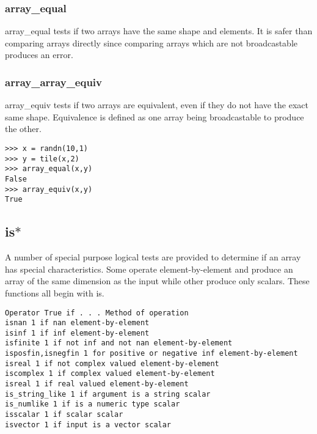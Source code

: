 \documentclass[KSmain.tex]{subfiles}
\begin{document}
\subsubsection{array\_equal}
array\_equal tests if two arrays have the same shape and elements. It is safer than comparing arrays directly
since comparing arrays which are not broadcastable produces an error.
\subsubsection{array\_array\_equiv}
array\_equiv tests if two arrays are equivalent, even if they do not have the exact same shape. Equivalence
is defined as one array being broadcastable to produce the other.
\begin{framed}
\begin{verbatim}>>> x = randn(10,1)
>>> y = tile(x,2)
>>> array_equal(x,y)
False
>>> array_equiv(x,y)
True
\end{verbatim}
\end{framed}

\subsection{ is$\ast$}
A number of special purpose logical tests are provided to determine if an array has special characteristics.
Some operate element-by-element and produce an array of the same dimension as the input while other
produce only scalars. These functions all begin with is.

\begin{verbatim}
Operator True if . . . Method of operation
isnan 1 if nan element-by-element
isinf 1 if inf element-by-element
isfinite 1 if not inf and not nan element-by-element
isposfin,isnegfin 1 for positive or negative inf element-by-element
isreal 1 if not complex valued element-by-element
iscomplex 1 if complex valued element-by-element
isreal 1 if real valued element-by-element
is_string_like 1 if argument is a string scalar
is_numlike 1 if is a numeric type scalar
isscalar 1 if scalar scalar
isvector 1 if input is a vector scalar
\end{verbatim}
\end{document}
